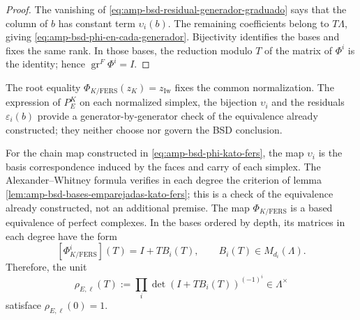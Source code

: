 \begin{proof}
The vanishing of \eqref{eq:amp-bsd-residual-generador-graduado} says that the
column of \(b\) has constant term \(\upsilon_i(b)\). The remaining
coefficients belong to \(T\Lambda\), giving
\eqref{eq:amp-bsd-phi-en-cada-generador}. Bijectivity identifies the
bases and fixes the same rank. In those bases, the reduction modulo \(T\) of the
matrix of \(\Phi^i\) is the identity; hence
\(\operatorname{gr}^{F}\Phi^i=I\).
\end{proof}

The root equality
\(\Phi_{K/\mathrm{FERS}}(z_K)=z_{\mathrm{Iw}}\) fixes the common normalization.
The expression of \(P_E^K\) on each normalized simplex, the bijection
\(\upsilon_i\) and the residuals \(\varepsilon_i(b)\) provide a
generator-by-generator check of the equivalence already constructed; they neither choose nor
govern the BSD conclusion.

\begin{lemma}
\label{lem:amp-bsd-equivalencia-kato-fers}
For the chain map constructed in
\eqref{eq:amp-bsd-phi-kato-fers}, the map \(\upsilon_i\) is the
basis correspondence induced by the faces and carry of each
simplex. The Alexander--Whitney formula verifies in each degree the
criterion of lemma \ref{lem:amp-bsd-bases-emparejadas-kato-fers}; this is a
check of the equivalence already constructed, not an additional premise.
The map \(\Phi_{K/\mathrm{FERS}}\) is a based equivalence of
perfect complexes. In the bases ordered by depth, its matrices in
each degree have the form
\begin{equation}\label{eq:amp-bsd-matriz-kato-fers}
 [\Phi_{K/\mathrm{FERS}}^i](T)=I+TB_i(T),
 \qquad B_i(T)\in M_{d_i}(\Lambda).
\end{equation}
Therefore, the unit
\begin{equation}\label{eq:amp-bsd-rho-determinantal}
 \rho_{E,\ell}(T)
 :=\prod_i\det\!\left(I+TB_i(T)\right)^{(-1)^i}
 \in\Lambda^\times
\end{equation}
satisface \(\rho_{E,\ell}(0)=1\).
\end{lemma}

